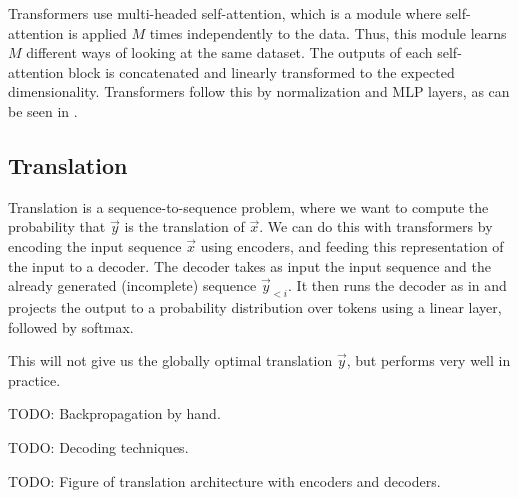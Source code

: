 Transformers \citep{vaswani2017attention} use multi-headed self-attention,
which is a module where self-attention is applied $M$ times independently to
the data. Thus, this module learns $M$ different ways of looking at the same
dataset. The outputs of each self-attention block is concatenated and linearly
transformed to the expected dimensionality. Transformers follow this by
normalization and MLP layers, as can be seen in .

\subsection{Translation}

Translation is a sequence-to-sequence problem, where we want to compute the
probability that $\vec{y}$ is the translation of $\vec{x}$. We can do this with
transformers by encoding the input sequence $\vec{x}$ using encoders, and
feeding this representation of the input to a decoder. The decoder takes as
input the input sequence and the already generated (incomplete) sequence
$\vec{y}_{<i}$. It then runs the decoder as in  and
projects the output to a probability distribution over tokens using a linear
layer, followed by softmax.

This will not give us the globally optimal translation $\vec{y}$, but performs
very well in practice.

TODO: Backpropagation by hand.

TODO: Decoding techniques.

TODO: Figure of translation architecture with encoders and decoders.
